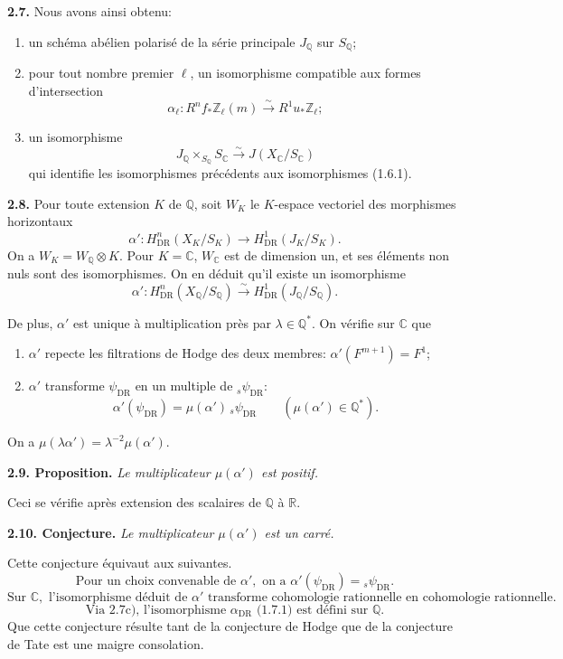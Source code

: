 \documentclass[10pt]{article}
\newcommand{\C}{\mathbb C}
\newcommand{\Q}{\mathbb Q}
\newcommand{\Z}{\mathbb Z}
\newcommand{\DR}{\mathrm{DR}}
\newcommand{\R}{\mathbb R}
\newcommand{\iso}{\xrightarrow{\sim}}
\newcommand{\sourcebreak}{\clearpage}
\begin{document}
\noindent\textbf{2.7.} Nous avons ainsi obtenu:
\begin{enumerate}[label=\alph*)]
\item un schéma abélien polarisé de la série principale \(J_\Q\) sur \(S_\Q\);
\item pour tout nombre premier \(\ell\), un isomorphisme compatible aux formes d'intersection
\[
\alpha_\ell:R^nf_*\Z_\ell(m)\iso R^1u_*\Z_\ell;
\]
\item un isomorphisme
\[
J_\Q\times_{S_\Q}S_\C\iso J(X_\C/S_\C)
\]
qui identifie les isomorphismes précédents aux isomorphismes (1.6.1).
\end{enumerate}

\noindent\textbf{2.8.} Pour toute extension \(K\) de \(\Q\), soit \(W_K\) le \(K\)-espace vectoriel des morphismes horizontaux
\[
\alpha':H^n_{\DR}(X_K/S_K)\longrightarrow H^1_{\DR}(J_K/S_K).
\]
On a \(W_K=W_\Q\otimes K\). Pour \(K=\C\), \(W_\C\) est de dimension un, et ses éléments non nuls sont des isomorphismes. On en déduit qu'il existe un isomorphisme
\[
\alpha':H^n_{\DR}(X_\Q/S_\Q)\iso H^1_{\DR}(J_\Q/S_\Q).
\]

\sourcebreak
De plus, \(\alpha'\) est unique à multiplication près par \(\lambda\in\Q^*\). On vérifie sur \(\C\) que
\begin{enumerate}[label=\alph*)]
\item \(\alpha'\) repecte les filtrations de Hodge des deux membres: \(\alpha'(F^{m+1})=F^1\);
\item \(\alpha'\) transforme \(\psi_{\DR}\) en un multiple de \({}_s\psi_{\DR}\):
\[
\alpha'(\psi_{\DR})=\mu(\alpha')\,{}_s\psi_{\DR}\qquad(\mu(\alpha')\in\Q^*).
\]
\end{enumerate}
On a \(\mu(\lambda\alpha')=\lambda^{-2}\mu(\alpha')\).

\noindent\textbf{2.9. Proposition.} \emph{Le multiplicateur \(\mu(\alpha')\) est positif.}

Ceci se vérifie après extension des scalaires de \(\Q\) à \(\R\).

\noindent\textbf{2.10. Conjecture.} \emph{Le multiplicateur \(\mu(\alpha')\) est un carré.}

Cette conjecture équivaut aux suivantes.
\[
\tag{2.10.1}
\text{Pour un choix convenable de }\alpha',\text{ on a }\alpha'(\psi_{\DR})={}_s\psi_{\DR}.
\]
\[
\tag{2.10.2}
\text{Sur }\C,\text{ l'isomorphisme déduit de }\alpha'\text{ transforme cohomologie rationnelle en cohomologie rationnelle.}
\]
\[
\tag{2.10.3}
\text{Via 2.7c), l'isomorphisme }\alpha_{\DR}\text{ (1.7.1) est défini sur }\Q.
\]
Que cette conjecture résulte tant de la conjecture de Hodge que de la conjecture de Tate est une maigre consolation.
\end{document}
